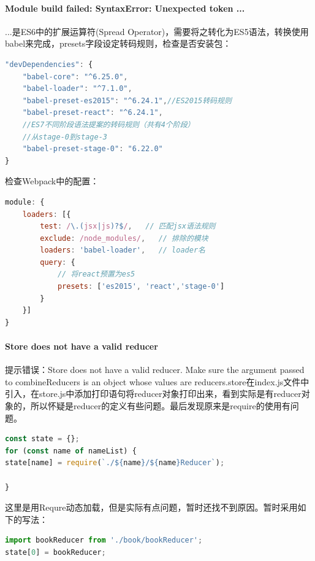 \documentclass[letter]{book}
\begin{document}
\paragraph{Module build failed: SyntaxError: Unexpected token ...}

...是ES6中的扩展运算符(Spread Operator)，需要将之转化为ES5语法，转换使用babel来完成，presets字段设定转码规则，检查是否安装包：

\begin{lstlisting}[language=Javascript]
"devDependencies": {
	"babel-core": "^6.25.0",
	"babel-loader": "^7.1.0",
	"babel-preset-es2015": "^6.24.1",//ES2015转码规则
	"babel-preset-react": "^6.24.1",
	//ES7不同阶段语法提案的转码规则（共有4个阶段）
	//从stage-0到stage-3
	"babel-preset-stage-0": "6.22.0"
}
\end{lstlisting}

检查Webpack中的配置：

\begin{lstlisting}[language=Javascript]
module: {
	loaders: [{
		test: /\.(jsx|js)?$/,   // 匹配jsx语法规则
		exclude: /node_modules/,   // 排除的模块
		loaders: 'babel-loader',   // loader名
		query: {
			// 将react预置为es5
			presets: ['es2015', 'react','stage-0']
		}
	}]
}
\end{lstlisting}

\paragraph{Store does not have a valid reducer}

提示错误：Store does not have a valid reducer. Make sure the argument passed to combineReducers is an object whose values are reducers.store在index.js文件中引入，在store.js中添加打印语句将reducer对象打印出来，看到实际是有reducer对象的，所以怀疑是reducer的定义有些问题。最后发现原来是require的使用有问题。

\begin{lstlisting}[language=Javascript]
const state = {};
for (const name of nameList) {
state[name] = require(`./${name}/${name}Reducer`);

}
\end{lstlisting}

这里是用Requre动态加载，但是实际有点问题，暂时还找不到原因。暂时采用如下的写法：


\begin{lstlisting}[language=Javascript]
import bookReducer from './book/bookReducer';
state[0] = bookReducer;
\end{lstlisting}
\end{document}
